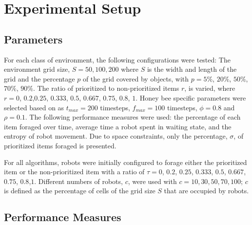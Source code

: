 
\chapter{Experimental Setup}
\label{chap:third}




\section{Parameters}
\label{parameters}

	
For each class of environment, the following configurations were tested: The environment grid size, $S=50,100,200$ where $S$ is the width and length of the grid and the percentage $p$ of the grid covered by objects, with $p= 5\%$, $20\%$, $50\%$, $70\%$, $90\%$. The ratio of prioritized to non-prioritized items $r$, is varied, where $r=0$, $0.2$,$0.25$, $0.333$, $0.5$, $0.667$, $0.75$, $0.8$, $1$. Honey bee specific parameters were selected based on \cite{seeley2009wisdom} as 
$t_{max}=200$ timesteps, $f_{max}=100$ timesteps, $\phi=0.8$ and $\rho=0.1$.
The following performance measures were used: the percentage of each item foraged over time, average time a robot spent in waiting state, and the entropy of robot movement. Due to space constraints, only the percentage, $\sigma$, of prioritized items foraged is presented. 

For all algorithms, robots were initially configured to forage either the prioritized item or the non-prioritized item with a ratio of $\tau=0$, $0.2$, $0.25$, $0.333$, $0.5$, $0.667$, $0.75$, $0.8$,$1$. Different numbers of robots, $c$, were used with $c=10, 30, 50, 70, 100$; $c$ is defined as the percentage of cells of the grid size $S$ that are occupied by robots.

\section{Performance Measures}
\label{thri:third:performancemeasures}

